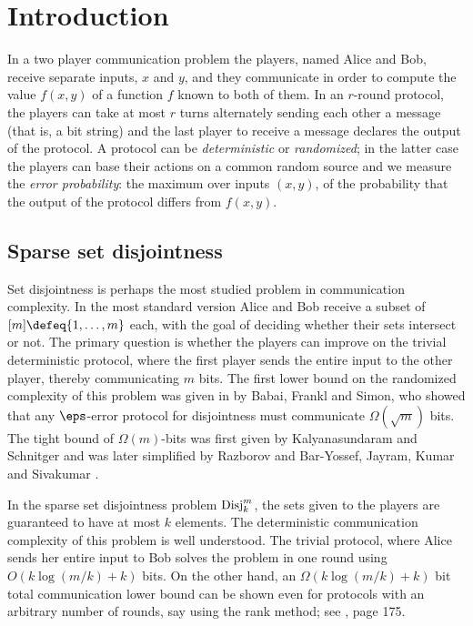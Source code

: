 \section{Introduction}
In a two player communication problem the players, named Alice
and Bob, receive separate inputs, $x$ and $y$, and they
communicate in order to compute the value $f(x,y)$ of a function
$f$ known to both of them. 
In an $r$-round protocol, the players can take at most $r$
turns alternately sending each other a message 
(that is, a bit string) and the last
player to receive a message declares the output of the protocol.
A protocol can be {\em deterministic} or {\em randomized}; in
the latter case the players can base their actions on a common
random source and we measure the {\em error probability}: the
maximum over inputs $(x,y)$, of the probability that the output
of the protocol differs from $f(x,y)$.

\subsection{Sparse set disjointness}
Set disjointness is perhaps the most studied problem in
communication complexity. In the most standard version Alice and
Bob receive a subset of $[m]\defeq\{1,\ldots,m\}$ each, with the
goal of deciding whether their sets intersect or not. The
primary question is whether the players can improve on the
trivial deterministic protocol, where the first player sends the
entire input to the other player, thereby communicating $m$
bits. The first lower bound on the randomized complexity of this
problem was given in \cite{BabaiFS1986} by Babai, Frankl and Simon, 
who showed that any $\eps$-error protocol for disjointness must
communicate $\Omega(\sqrt{m})$ bits. The tight bound of
$\Omega(m)$-bits was first given by Kalyanasundaram and
Schnitger \cite{KalyanasundaramS1992} and was later simplified by
Razborov \cite{Razborov1992} and 
Bar-Yossef, Jayram, Kumar and Sivakumar \cite{Bar-YossefJKS2004}.

In the sparse set disjointness problem $\operatorname{Disj}_k^m$, the sets
given to the players are guaranteed to have at most $k$
elements. The deterministic communication complexity of this
problem is well understood. The trivial protocol, where Alice
sends her entire input to Bob solves the problem in one round
using $O(k\log(m/k) + k)$ bits. On the other hand, an
$\Omega(k\log(m/k) + k)$ bit total communication lower bound can be
shown even for protocols with an arbitrary number of rounds, say
using the rank method; see \cite{KushilevitzN1997}, page 175.

